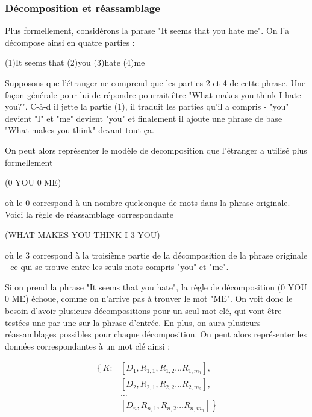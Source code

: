 \documentclass[11pt,a4paper]{report}
\begin{document}
  \subsubsection*{Décomposition et réassamblage}
  Plus formellement, considérons la phrase "It seems that you hate me". On l'a décompose ainsi
  en quatre parties :

  \begin{center}
    (1)It seems that (2)you (3)hate (4)me
  \end{center} 
  
  Supposons que l'étranger ne comprend que les parties 2 et 4 de cette phrase. Une façon générale 
  pour lui de répondre pourrait être "What makes you think I hate you?". C-à-d il jette la partie (1), 
  il traduit les parties qu'il a compris - "you" devient "I" et "me" devient "you" et finalement il 
  ajoute une phrase de base "What makes you think" devant tout ça. 

  On peut alors représenter le modèle de decomposition que l'étranger a utilisé plus formellement 

  \begin{center}
    (0 YOU 0 ME)
  \end{center} 

  où le 0 correspond à un nombre quelconque de mots dans la phrase originale. 
  Voici la règle de réassamblage correspondante

  \begin{center}
    (WHAT MAKES YOU THINK I 3 YOU)
  \end{center} 
  
  où le 3 correspond à la troisième partie de la décomposition de la phrase originale 
  - ce qui se trouve entre les seuls mots compris "you" et "me". 
   
  Si on prend la phrase "It seems that you hate", la règle de décomposition 
  (0 YOU 0 ME) échoue, comme on n'arrive pas à trouver le mot "ME". On voit donc le 
  besoin d'avoir plusieurs décompositions pour un seul mot clé, qui vont être testées 
  une par une sur la phrase d'entrée. En plus, on aura plusieurs réassamblages possibles pour 
  chaque décomposition. On peut alors représenter les données correspondantes à un mot clé 
  ainsi : 

  \begin{align*}
    \left\{ K: \right. 
    &\left[ D_{1}, R_{1, 1}, R_{1, 2} \ldots R_{1, m_{1}} \right], \\
    &\left[ D_{2}, R_{2, 1}, R_{2, 2} \ldots R_{2, m_{2}} \right], \\
    &\ldots \\
    &\left. \left[ D_{n}, R_{n, 1}, R_{n, 2} \ldots R_{n, m_{n}} \right] \right\}
  \end{align*}
\end{document}
